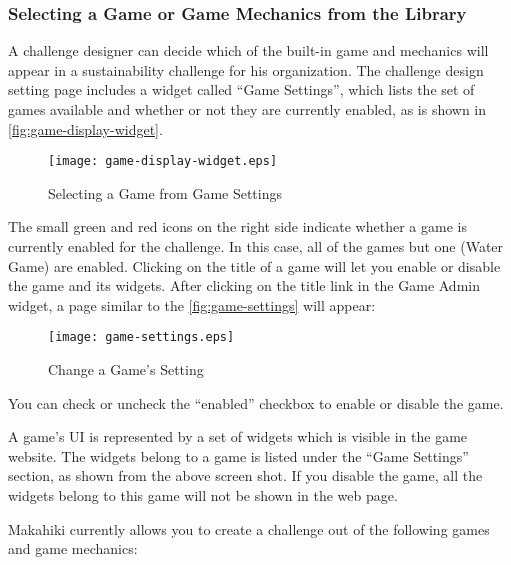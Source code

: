 \subsubsection{Selecting a Game or Game Mechanics from the Library}
A challenge designer can decide which of the built-in game and mechanics will appear in a sustainability challenge for his organization. The challenge design setting page includes a widget called ``Game Settings'', which lists the set of games available and whether or not they are currently enabled, as is shown in \autoref{fig:game-display-widget}.

\begin{figure}[!ht]
  \center
  \texttt{[image: game-display-widget.eps]}
  \caption{Selecting a Game from Game Settings}
  \label{fig:game-display-widget}
\end{figure}

The small green and red icons on the right side indicate whether a game is currently enabled for the challenge. In this case, all of the games but one (Water Game) are enabled. Clicking on the title of a game will let you enable or disable the game and its widgets. After clicking on the title link in the Game Admin widget, a page similar to the \autoref{fig:game-settings} will appear:

\begin{figure}[!ht]
  \center
  \texttt{[image: game-settings.eps]}
  \caption{Change a Game's Setting}
  \label{fig:game-settings}
\end{figure}

You can check or uncheck the ``enabled'' checkbox to enable or disable the game.

A game's UI is represented by a set of widgets which is visible in the game website. The widgets belong to a game is listed under the “Game Settings” section, as shown from the above screen shot. If you disable the game, all the widgets belong to this game will not be shown in the web page.

Makahiki currently allows you to create a challenge out of the following games and game mechanics:

